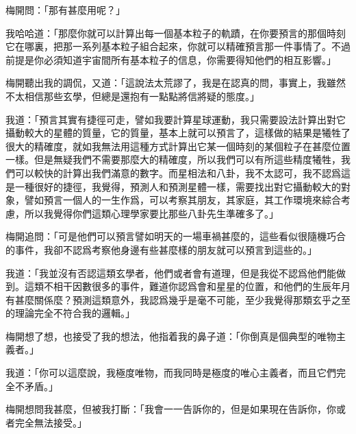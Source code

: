 梅開問：「那有甚麼用呢？」

我哈哈道：「那麼你就可以計算出每一個基本粒子的軌蹟，在你要預言的那個時刻它在哪裏，把那一系列基本粒子組合起來，你就可以精確預言那一件事情了。不過前提是你必須知道宇宙間所有基本粒子的信息，你需要得知他們的相互影響。」


梅開聽出我的調侃，又道：「這說法太荒謬了，我是在認真的問，事實上，我雖然不太相信那些玄學，但總是還抱有一點點將信將疑的態度。」

我道：「預言其實有捷徑可走，譬如我要計算星球運動，我只需要設法計算出對它攝動較大的星體的質量，它的質量，基本上就可以預言了，這樣做的結果是犧牲了很大的精確度，就如我無法用這種方式計算出它某一個時刻的某個粒子在甚麼位置一樣。但是無疑我們不需要那麼大的精確度，所以我們可以有所這些精度犧牲，我們可以較快的計算出我們滿意的數字。而星相法和八卦，我不太認可，我不認爲這是一種很好的捷徑，我覺得，預測人和預測星體一樣，需要找出對它攝動較大的對象，譬如預言一個人的一生作爲，可以考察其朋友，其家庭，其工作環境來綜合考慮，所以我覺得你們這類心理學家要比那些八卦先生準確多了。」

梅開追問：「可是他們可以預言譬如明天的一場車禍甚麼的，這些看似很隨機巧合的事件，我卻不認爲考察他身邊有些甚麼樣的朋友就可以預言到這些的。」

我道：「我並沒有否認這類玄學者，他們或者會有道理，但是我從不認爲他們能做到。這類不相干因數很多的事件，難道你認爲會和星星的位置，和他們的生辰年月有甚麼關係麼？預測這類意外，我認爲幾乎是毫不可能，至少我覺得那類玄乎之至的理論完全不符合我的邏輯。」

梅開想了想，也接受了我的想法，他指着我的鼻子道：「你倒真是個典型的唯物主義者。」

我道：「你可以這麼說，我極度唯物，而我同時是極度的唯心主義者，而且它們完全不矛盾。」

梅開想問我甚麼，但被我打斷：「我會一一告訴你的，但是如果現在告訴你，你或者完全無法接受。」

